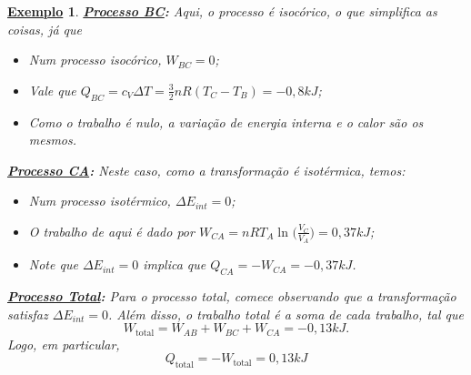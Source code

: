 \documentclass{article}
\newtheorem{example}{\underline{Exemplo}}
\begin{document}
\begin{example}
  \textbf{\underline{Processo BC}:} Aqui, o processo é isocórico, o que simplifica as coisas, já que
  \begin{itemize}
    \item[\(W_{BC}\):] Num processo isocórico, \(W_{BC} = 0\);
    \item[\(Q_{BC}\):] Vale que \(Q_{BC} = c_{V}\Delta T = \frac{3}{2}nR(T_{C} - T_{B}) = - 0,8kJ\);
    \item[\(E_{BC}\):] Como o trabalho é nulo, a variação de energia interna e o calor são os mesmos.
  \end{itemize}

  \textbf{\underline{Processo CA}:} Neste caso, como a transformação é isotérmica, temos:
  \begin{itemize}
    \item[\(E_{CA}\):] Num processo isotérmico, \(\Delta E_{int} = 0\);
    \item[\(W_{CA}\):] O trabalho de aqui é dado por \(W_{CA} = nRT_{A}\ln^{}{\biggl(\frac{V_{C}}{V_{A}}\biggr)} = 0,37kJ\);
    \item[\(Q_{CA}\):] Note que \(\Delta E_{int} = 0\) implica que \(Q_{CA} = - W_{CA} = -0,37kJ\).
  \end{itemize}

  \textbf{\underline{Processo Total}:} Para o processo total, comece observando que a transformação
  satisfaz \(\Delta E_{int} = 0\). Além disso, o trabalho total é a soma de cada trabalho, tal que 
  \[
    W_{\text{total}} = W_{AB} + W_{BC} + W_{CA} = -0,13kJ.
  \]
  Logo, em particular, 
  \[
    Q_{\text{total}} = - W_{\text{total}} = 0,13kJ
  \]
\end{example}
\end{document}
